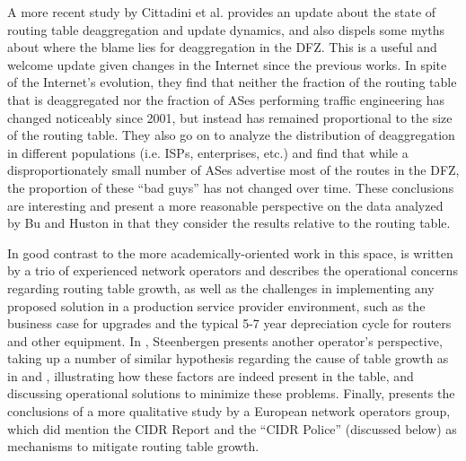 A more recent study by Cittadini et al. \cite{Cittadini:2010pi} provides an
update about the state of routing table deaggregation and update dynamics, and
also dispels some myths about where the blame lies for deaggregation in the
DFZ. This is a useful and welcome update given changes in the Internet since
the previous works. In spite of the Internet's evolution, they find that
neither the fraction of the routing table that is deaggregated nor the fraction
of ASes performing traffic engineering has changed noticeably since 2001, but
instead has remained proportional to the size of the routing table. They also
go on to analyze the distribution of deaggregation in different populations
(i.e. ISPs, enterprises, etc.) and find that while a disproportionately small
number of ASes advertise most of the routes in the DFZ, the proportion of these
``bad guys'' has not changed over time. These conclusions are interesting and
present a more reasonable perspective on the data analyzed by Bu and Huston in
that they consider the results relative to the routing table.

In good contrast to the more academically-oriented work in this space,
\cite{Zhao:2001ly} is written by a trio of experienced network operators and
describes the operational concerns regarding routing table growth, as well as
the challenges in implementing any proposed solution in a production service
provider environment, such as the business case for upgrades and the typical
5-7 year depreciation cycle for routers and other equipment. In
\cite{Steenbergen:2010nx}, Steenbergen presents another operator's perspective,
taking up a number of similar hypothesis regarding the cause of table growth as
in \cite{Bu:2004fk} and \cite{Cittadini:2010pi}, illustrating how these factors
are indeed present in the table, and discussing operational solutions to
minimize these problems. Finally, \cite{Smith:2006vn} presents the conclusions
of a more qualitative study by a European network operators group, which did
mention the CIDR Report and the ``CIDR Police'' (discussed below) as mechanisms
to mitigate routing table growth.



